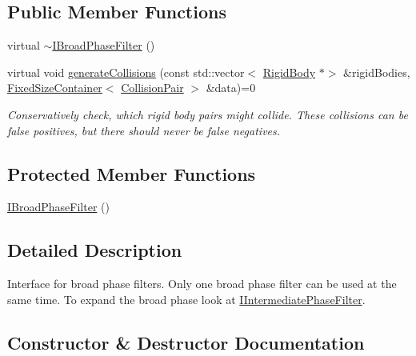 \subsection*{Public Member Functions}
\begin{DoxyCompactItemize}
\item 
virtual \mbox{\hyperlink{classr3_1_1_i_broad_phase_filter_af6cd5cfcf4487d97916debae0011244f}{$\sim$\+I\+Broad\+Phase\+Filter}} ()
\item 
virtual void \mbox{\hyperlink{classr3_1_1_i_broad_phase_filter_a5f437f6390a8f10bf96d72e35e3b4432}{generate\+Collisions}} (const std\+::vector$<$ \mbox{\hyperlink{classr3_1_1_rigid_body}{Rigid\+Body}} $\ast$$>$ \&rigid\+Bodies, \mbox{\hyperlink{classr3_1_1_fixed_size_container}{Fixed\+Size\+Container}}$<$ \mbox{\hyperlink{classr3_1_1_collision_pair}{Collision\+Pair}} $>$ \&data)=0
\begin{DoxyCompactList}\small\item\em Conservatively check, which rigid body pairs might collide. These collisions can be false positives, but there should never be false negatives. \end{DoxyCompactList}\end{DoxyCompactItemize}
\subsection*{Protected Member Functions}
\begin{DoxyCompactItemize}
\item 
\mbox{\hyperlink{classr3_1_1_i_broad_phase_filter_ab1eb5dc44548078aa0716eedbab8ac11}{I\+Broad\+Phase\+Filter}} ()
\end{DoxyCompactItemize}


\subsection{Detailed Description}
Interface for broad phase filters. Only one broad phase filter can be used at the same time. To expand the broad phase look at \mbox{\hyperlink{classr3_1_1_i_intermediate_phase_filter}{I\+Intermediate\+Phase\+Filter}}. 

\subsection{Constructor \& Destructor Documentation}
\mbox{\label{classr3_1_1_i_broad_phase_filter_af6cd5cfcf4487d97916debae0011244f}} 
